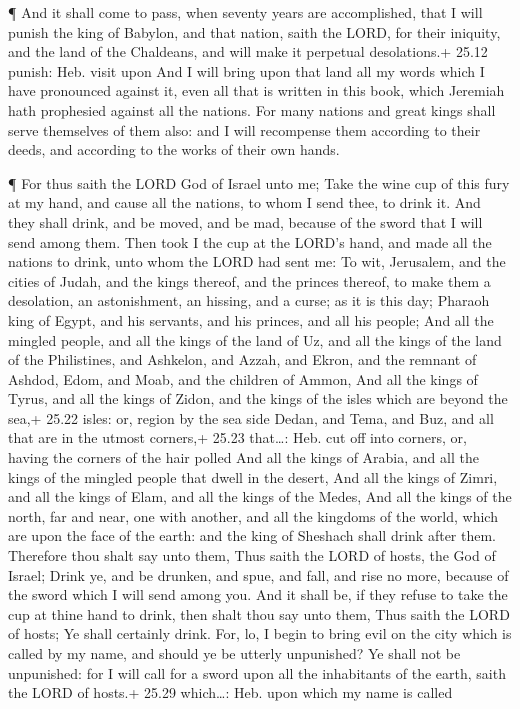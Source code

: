  ¶ And it shall come to pass, when seventy years are
accomplished, that I will punish the king of Babylon, and that nation,
saith the LORD, for their iniquity, and the land of the Chaldeans, and
will make it perpetual desolations.+ 25.12 punish: Heb. visit upon
 And I will bring upon that land all my words which I have
pronounced against it, even all that is written in this book, which
Jeremiah hath prophesied against all the nations.  For many
nations and great kings shall serve themselves of them also: and I will
recompense them according to their deeds, and according to the works of
their own hands.

 ¶ For thus saith the LORD God of Israel unto me; Take the
wine cup of this fury at my hand, and cause all the nations, to whom I
send thee, to drink it.  And they shall drink, and be
moved, and be mad, because of the sword that I will send among them.
 Then took I the cup at the LORD's hand, and made all the
nations to drink, unto whom the LORD had sent me:  To wit,
Jerusalem, and the cities of Judah, and the kings thereof, and the
princes thereof, to make them a desolation, an astonishment, an hissing,
and a curse; as it is this day;  Pharaoh king of Egypt, and
his servants, and his princes, and all his people;  And all
the mingled people, and all the kings of the land of Uz, and all the
kings of the land of the Philistines, and Ashkelon, and Azzah, and
Ekron, and the remnant of Ashdod,  Edom, and Moab, and the
children of Ammon,  And all the kings of Tyrus, and all the
kings of Zidon, and the kings of the isles which are beyond the sea,+
25.22 isles: or, region by the sea side  Dedan, and Tema,
and Buz, and all that are in the utmost corners,+ 25.23 that\ldots: Heb.
cut off into corners, or, having the corners of the hair polled
 And all the kings of Arabia, and all the kings of the
mingled people that dwell in the desert,  And all the kings
of Zimri, and all the kings of Elam, and all the kings of the Medes,
 And all the kings of the north, far and near, one with
another, and all the kingdoms of the world, which are upon the face of
the earth: and the king of Sheshach shall drink after them.
 Therefore thou shalt say unto them, Thus saith the LORD of
hosts, the God of Israel; Drink ye, and be drunken, and spue, and fall,
and rise no more, because of the sword which I will send among you.
 And it shall be, if they refuse to take the cup at thine
hand to drink, then shalt thou say unto them, Thus saith the LORD of
hosts; Ye shall certainly drink.  For, lo, I begin to bring
evil on the city which is called by my name, and should ye be utterly
unpunished? Ye shall not be unpunished: for I will call for a sword upon
all the inhabitants of the earth, saith the LORD of hosts.+ 25.29
which\ldots: Heb. upon which my name is called

